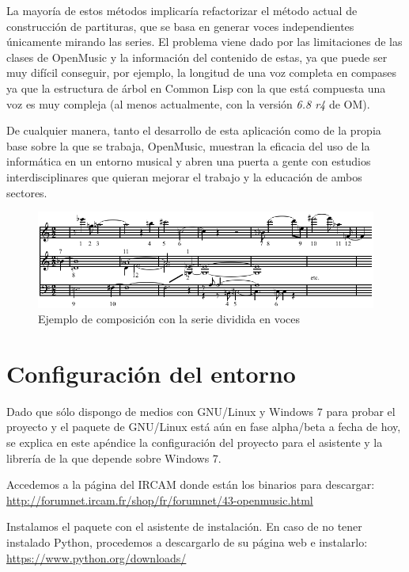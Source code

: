 \documentclass[a4paper,openany,oneside,12pt]{book}
\begin{document}
La mayoría de estos métodos implicaría refactorizar el método actual de construcción de partituras, que se basa en generar voces independientes únicamente mirando las series. El problema viene dado por las limitaciones de las clases de OpenMusic y la información del contenido de estas, ya que puede ser muy difícil conseguir, por ejemplo, la longitud de una voz completa en compases ya que la estructura de árbol en Common Lisp con la que está compuesta una voz es muy compleja (al menos actualmente, con la versión \emph{6.8 r4} de OM).

De cualquier manera, tanto el desarrollo de esta aplicación como de la propia base sobre la que se trabaja, OpenMusic, muestran la eficacia del uso de la informática en un entorno musical y abren una puerta a gente con estudios interdisciplinares que quieran mejorar el trabajo y la educación de ambos sectores.

\begin{figure}
\centering
\includegraphics[width=\textwidth]{img/Schoenberg_-_Wind_Quintet_opening.png}
\caption{Ejemplo de composición con la serie dividida en voces\cite{wiki:twelvetonetechnique}} \label{fig:twelvetoneexample}
\end{figure}


\nocite{*}
\cleardoublepage
{}



\appendix
\chapter{Configuración del entorno}\label{aped.A}
Dado que sólo dispongo de medios con GNU/Linux y Windows 7 para probar el proyecto y el paquete de GNU/Linux está aún en fase alpha/beta a fecha de hoy, se explica en este apéndice la configuración del proyecto para el asistente y la librería de la que depende sobre Windows 7.

Accedemos a la página del IRCAM donde están los binarios para descargar: \url{http://forumnet.ircam.fr/shop/fr/forumnet/43-openmusic.html}

Instalamos el paquete con el asistente de instalación. En caso de no tener instalado Python, procedemos a descargarlo de su página web e instalarlo: \url{https://www.python.org/downloads/}
\end{document}

